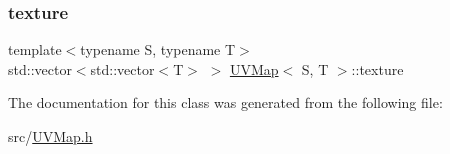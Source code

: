 \subsubsection{\texorpdfstring{texture}{texture}}
{\footnotesize\ttfamily template$<$typename S, typename T$>$ \\
std\+::vector$<$std\+::vector$<$T$>$ $>$ \mbox{\hyperlink{classUVMap}{U\+V\+Map}}$<$ S, T $>$\+::texture\hspace{0.3cm}{\ttfamily [private]}}



The documentation for this class was generated from the following file\+:\begin{DoxyCompactItemize}
\item 
src/\mbox{\hyperlink{UVMap_8h}{U\+V\+Map.\+h}}\end{DoxyCompactItemize}
